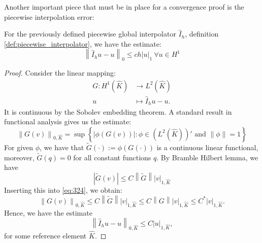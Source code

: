 \documentclass[../Main/main.tex]{subfiles}
\begin{document}
	Another important piece that must be in place for a convergence proof is the piecewise interpolation error:
	\begin{lemma}\label{lemma:int_error}
		For the previously defined piecewise global interpolator $\hat{I}_h$, definition \ref{def:piecewise_interpolator}, we have the estimate:
		\begin{equation}
			\left \| \hat{I}_h u - u \right \|_0 \leq c h | u |_1 \ \forall u \in H^1
		\end{equation}
	\end{lemma}
	\begin{proof}
		Consider the linear mapping:
		\begin{equation}\label{eq:324}
			\begin{aligned}
				G: H^1(\hat{K})&\rightarrow L^2(\hat{K}) \\
				u &\mapsto \hat{I}_h u - u.
			\end{aligned}
		\end{equation}
		It is continuous by the Sobolev embedding theorem.
		A standard result in functional analysis gives us the estimate:
		\begin{equation}
			\left \| G(v) \right \|_{0,\hat{K}} = \sup \left \{ |\phi (G(v)) |: \phi \in (L^2(\hat{K}))' \text{ and } \left \|\phi \right \|=1 \right \}
		\end{equation}
		For given $\phi$, we have that $\tilde{G}(\cdot) :=\phi(G(\cdot))$ is a continuous linear functional, moreover, $\tilde{G}(q)=0$ for all constant functions $q$. By Bramble Hilbert lemma, we have 
		\begin{equation}
			|\tilde{G}(v)|\leq C \left \| \tilde{G} \right \| |v|_{1,\hat{K}}
		\end{equation}
		Inserting this into \eqref{eq:324}, we obtain:
		\begin{equation}
				\left \| G(v) \right \|_{0,\hat{K}} \leq C \left \| \tilde{G} \right \|  |v|_{1,\hat{K}} \leq C \left \| G \right \| |v|_{1,\hat{K}} \leq C^*|v|_{1,\hat{K}}.
		\end{equation}
		Hence, we have the estimate
		\begin{equation}
			\left \| \hat{I}_h u - u \right \|_{0,\hat{K}} \leq C |u|_{1,\hat{K}},
		\end{equation}
		for some reference element $\hat{K}$.
	\end{proof}
\end{document}
